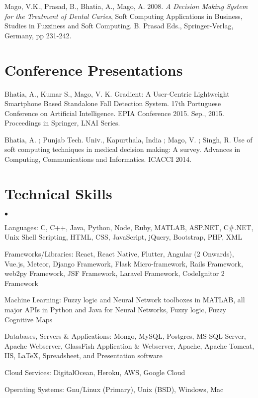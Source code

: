 \documentclass[margin,line]{res}
\newenvironment{list2}{
  \begin{list}{$\bullet$}{%
      \setlength{\itemsep}{0in}
      \setlength{\parsep}{0in} \setlength{\parskip}{0in}
      \setlength{\topsep}{0in} \setlength{\partopsep}{0in}
      \setlength{\leftmargin}{0.2in}}}{\end{list}}
\begin{document}
\begin{resume}
Mago, V.K., Prasad, B., Bhatia, A., Mago, A. 2008. \emph{A Decision Making System for the Treatment of Dental Caries}, Soft Computing Applications in Business, Studies in Fuzziness and Soft Computing. B. Prasad Eds., Springer-Verlag, Germany, pp 231-242.

\section{\sc Conference Presentations}
Bhatia, A., Kumar S., Mago, V. K. Gradient: A User-Centric Lightweight Smartphone Based Standalone Fall Detection System. 17th Portuguese Conference on Artificial Intelligence. EPIA Conference 2015. Sep., 2015. Proceedings in Springer, LNAI Series.

Bhatia, A. ; Punjab Tech. Univ., Kapurthala, India ; Mago, V. ; Singh, R. Use of soft computing techniques in medical decision making: A survey. Advances in Computing, Communications and Informatics. ICACCI 2014.  


\section{\sc Technical Skills}
\begin{list2}
\item Languages:  C, C++, Java, Python, Node, Ruby, MATLAB, ASP.NET, C\#.NET, Unix Shell Scripting, HTML, CSS, JavaScript, jQuery, Bootstrap, PHP, XML\\
\item Frameworks/Libraries: React, React Native, Flutter, Angular (2 Onwards), Vue.js, Meteor, Django Framework, Flask Micro-framework, Rails Framework, web2py Framework, JSF Framework, Laravel Framework, CodeIgnitor 2 Framework\\
\item Machine Learning: Fuzzy logic and Neural Network toolboxes in MATLAB, all major APIs in Python and Java for Neural Networks, Fuzzy logic, Fuzzy Cognitive Maps  
\item Databases, Servers \& Applications: Mongo, MySQL, Postgres, MS-SQL Server, Apache Webserver, GlassFish Application \& Webserver, Apache, Apache Tomcat, IIS, \LaTeX, Spreadsheet, and Presentation software\\
\item Cloud Services: DigitalOcean, Heroku, AWS, Google Cloud\\
\item Operating Systems:  Gnu/Linux (Primary), Unix (BSD), Windows, Mac\\
\end{list2}

\end{resume}
\end{document}
